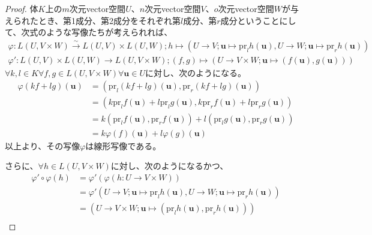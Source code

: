 \documentclass[dvipdfmx]{jsarticle}
\begin{document}
\begin{proof}
体$K$上の$m$次元vector空間$U$、$n$次元vector空間$V$、$o$次元vector空間$W$が与えられたとき、第1成分、第2成分をそれぞれ第$l$成分、第$r$成分ということにして、次式のような写像たちが考えられれば、
\begin{align*}
\varphi:L(U,V \times W)\overset{\sim}{\rightarrow}L(U,V) \times L(U,W);h \mapsto \left( U \rightarrow V;\mathbf{u} \mapsto \mathrm{pr}_{l}{h\left( \mathbf{u} \right)},U \rightarrow W;\mathbf{u} \mapsto \mathrm{pr}_{r}{h\left( \mathbf{u} \right)} \right)
\end{align*}
\begin{align*}
\varphi':L(U,V) \times L(U,W) \rightarrow L(U,V \times W);(f,g) \mapsto \left( U \rightarrow V \times W;\mathbf{u} \mapsto \left( f\left( \mathbf{u} \right),g\left( \mathbf{u} \right) \right) \right)
\end{align*}
$\forall k,l \in K\forall f,g \in L(U,V \times W)\forall\mathbf{u} \in U$に対し、次のようになる。
\begin{align*}
\varphi(kf + lg)\left( \mathbf{u} \right) &= \left( \mathrm{pr}_{l}{(kf + lg)\left( \mathbf{u} \right)},\mathrm{pr}_{r}{(kf + lg)\left( \mathbf{u} \right)} \right)\\
&= \left( k\mathrm{pr}_{l}{f\left( \mathbf{u} \right)} + l\mathrm{pr}_{l}{g\left( \mathbf{u} \right)},k\mathrm{pr}_{r}{f\left( \mathbf{u} \right)} + l\mathrm{pr}_{r}{g\left( \mathbf{u} \right)} \right)\\
&= k\left( \mathrm{pr}_{l}{f\left( \mathbf{u} \right)},\mathrm{pr}_{r}{f\left( \mathbf{u} \right)} \right) + l\left( \mathrm{pr}_{l}{g\left( \mathbf{u} \right)},\mathrm{pr}_{r}{g\left( \mathbf{u} \right)} \right)\\
&= k\varphi(f)\left( \mathbf{u} \right) + l\varphi(g)\left( \mathbf{u} \right)
\end{align*}
以上より、その写像$\varphi$は線形写像である。\par
さらに、$\forall h \in L(U,V \times W)$に対し、次のようになるかつ、
\begin{align*}
\varphi' \circ \varphi(h) &= \varphi'\left( \varphi(h:U \rightarrow V \times W) \right)\\
&= \varphi'\left( U \rightarrow V;\mathbf{u} \mapsto \mathrm{pr}_{l}{h\left( \mathbf{u} \right)},U \rightarrow W;\mathbf{u} \mapsto \mathrm{pr}_{r}{h\left( \mathbf{u} \right)} \right)\\
&= \left( U \rightarrow V \times W;\mathbf{u} \mapsto \left( \mathrm{pr}_{l}{h\left( \mathbf{u} \right)},\mathrm{pr}_{r}{h\left( \mathbf{u} \right)} \right) \right)\\

\end{align*}
\end{proof}
\end{document}
